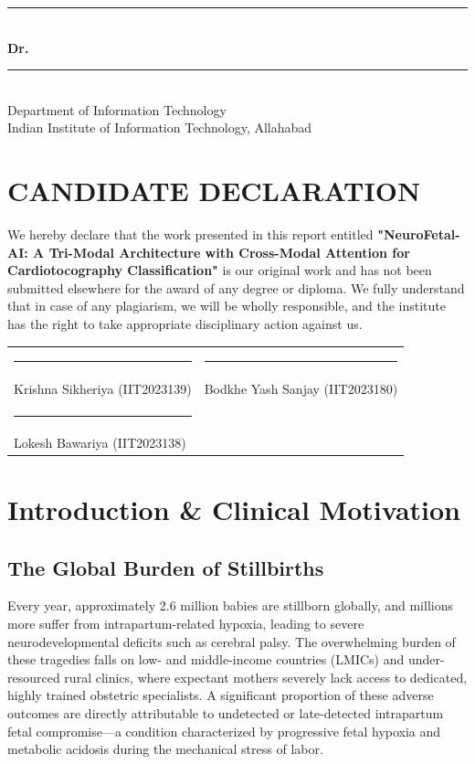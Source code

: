 \documentclass[12pt,a4paper]{report}
\begin{document}
\vspace{4cm}
\begin{flushright}
  \rule{5cm}{0.4pt} \\
  \vspace{0.2cm}
  \textbf{Dr. }\rule{3cm}{0.4pt} \\
  \vspace{0.2cm}
  Department of Information Technology \\
  Indian Institute of Information Technology, Allahabad
\end{flushright}
\clearpage

\chapter*{CANDIDATE DECLARATION}
\vspace{1em}
We hereby declare that the work presented in this report entitled \textbf{"NeuroFetal-AI: A Tri-Modal Architecture with Cross-Modal Attention for Cardiotocography Classification"} is our original work and has not been submitted elsewhere for the award of any degree or diploma. We fully understand that in case of any plagiarism, we will be wholly responsible, and the institute has the right to take appropriate disciplinary action against us.

\vspace{3cm}

\begin{tabular}{@{}p{}p{}@{}}
  \rule{5cm}{0.4pt} & \rule{5cm}{0.4pt} \\
  Krishna Sikheriya (IIT2023139) & Bodkhe Yash Sanjay (IIT2023180) \\[2cm]
  \rule{5cm}{0.4pt} & \\
  Lokesh Bawariya (IIT2023138) & \\
\end{tabular}

\clearpage

\tableofcontents
\clearpage
{}

\chapter{Introduction \& Clinical Motivation}
\section{The Global Burden of Stillbirths}
Every year, approximately 2.6 million babies are stillborn globally, and millions more suffer from intrapartum-related hypoxia, leading to severe neurodevelopmental deficits such as cerebral palsy. The overwhelming burden of these tragedies falls on low- and middle-income countries (LMICs) and under-resourced rural clinics, where expectant mothers severely lack access to dedicated, highly trained obstetric specialists. A significant proportion of these adverse outcomes are directly attributable to undetected or late-detected intrapartum fetal compromise---a condition characterized by progressive fetal hypoxia and metabolic acidosis during the mechanical stress of labor.
\end{document}
